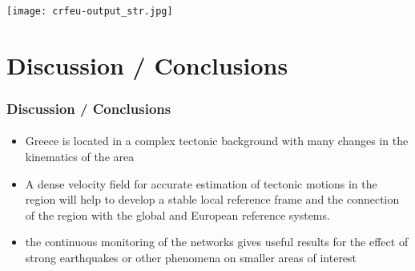 \begin{frame}
  \frametitle{}
  \framesubtitle{}
  \label{}

\begin{center}
  \texttt{[image: crfeu-output\_str.jpg]}
\end{center}

\end{frame}
\note{}





\section{Discussion / Conclusions}
\begin{frame}
  \frametitle{Discussion / Conclusions}
  \framesubtitle{}
  \label{}
  \begin{itemize}\setlength\itemsep{1em}
    \item Greece is located in a complex tectonic background with many changes in the kinematics of the area
    \item A dense velocity field for accurate estimation of tectonic motions in the region will help to develop a stable local reference frame and the connection of the region with the global and European reference systems.
    \item the continuous monitoring of the networks gives useful results for the effect of strong earthquakes or other phenomena on smaller areas of interest
  \end{itemize}
\end{frame}
\note{}

